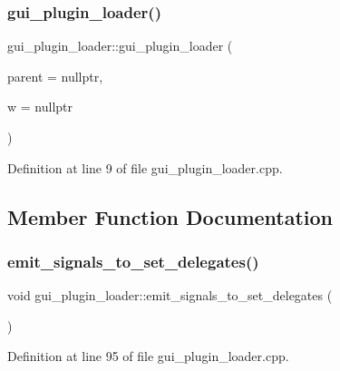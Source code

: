 \subsubsection{\texorpdfstring{gui\+\_\+plugin\+\_\+loader()}{gui\_plugin\_loader()}}
{\footnotesize\ttfamily gui\+\_\+plugin\+\_\+loader\+::gui\+\_\+plugin\+\_\+loader (\begin{DoxyParamCaption}\item[{Q\+Object $\ast$}]{parent = {\ttfamily nullptr},  }\item[{\hyperlink{classMainWindow}{Main\+Window} $\ast$}]{w = {\ttfamily nullptr} }\end{DoxyParamCaption})\hspace{0.3cm}{\ttfamily [explicit]}}



Definition at line 9 of file gui\+\_\+plugin\+\_\+loader.\+cpp.



\subsection{Member Function Documentation}
\mbox{\label{classgui__plugin__loader_a1aa2e332cd05954fcb9bbf506450c290}} 
\subsubsection{\texorpdfstring{emit\+\_\+signals\+\_\+to\+\_\+set\+\_\+delegates()}{emit\_signals\_to\_set\_delegates()}}
{\footnotesize\ttfamily void gui\+\_\+plugin\+\_\+loader\+::emit\+\_\+signals\+\_\+to\+\_\+set\+\_\+delegates (\begin{DoxyParamCaption}{ }\end{DoxyParamCaption})\hspace{0.3cm}{\ttfamily [private]}}



Definition at line 95 of file gui\+\_\+plugin\+\_\+loader.\+cpp.

